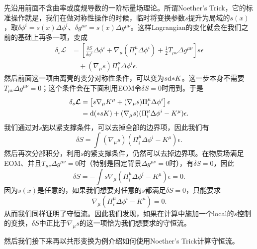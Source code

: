 先沿用前面不含曲率或度规导数的一阶标量场理论。所谓Noether's Trick，它的标准操作就是，我们在做对称性操作的时候，临时将变换参数$s$提升为局域的$s(x)$，取$\delta\phi^i=s(x)\Delta\phi^i$、$\delta g^{\mu\nu}=s(x)\Delta g^{\mu\nu}$。这样Lagrangian的变化就会在我们之前的基础上再多一项，变成
\begin{equation}
    \begin{aligned}
        \delta_s\boldsymbol{\mathcal L}
        &=\left[\frac{\delta S}{\delta\phi^i}\Delta\phi^i
        +\nabla_\mu(\Pi_i^\mu\Delta\phi^i)
        +\frac12T_{\mu\nu}\Delta g^{\mu\nu}\right]s\epsilon\\
        &\quad+(\nabla_\mu s)\Pi_i^\mu\Delta\phi^i\epsilon.
    \end{aligned}
\end{equation}
然后前面这一项由离壳的变分对称性条件，可以变为$s\mathrm d{*K}$。这一步本身不需要$T_{\mu\nu}\Delta g^{\mu\nu}=0$；这个条件会在下面利用EOM令$\delta S=0$时用到。于是
\begin{align}
    \delta_s\boldsymbol{\mathcal L}
    &=\left[s\nabla_\mu K^\mu
    +(\nabla_\mu s)\Pi_i^\mu\Delta\phi^i\right]\epsilon\notag\\
    &=\mathrm d({*sK})+(\nabla_\mu s)(\Pi_i^\mu\Delta\phi^i-K^\mu)\epsilon.
\end{align}
我们通过对$s$施以紧支撑条件，可以去掉全部的边界项，因此我们有
\begin{equation}
    \delta S=\int(\nabla_\mu s)(\Pi_i^\mu\Delta\phi^i-K^\mu)\epsilon.
    \label{eq:noether-trick-standard}
\end{equation}
然后再次分部积分，利用$s$的紧支撑条件，仍然可以去掉边界项。在物质场满足EOM、并且$T_{\mu\nu}\Delta g^{\mu\nu}=0$时（特别是固定背景$\Delta g^{\mu\nu}=0$时），有$\delta S=0$，因此
\begin{equation}
    \delta S=-\int s\nabla_\mu(\Pi_i^\mu\Delta\phi^i-K^\mu)\epsilon=0.
    \label{noether-trick}
\end{equation}
因为$s(x)$是任意的，如果我们想要对任意的$s$都满足$\delta S=0$，只能要求
\begin{equation}
    \nabla_\mu(\Pi_i^\mu\Delta\phi^i-K^\mu)=0.
\end{equation}
从而我们同样证明了守恒流。因此我们发现，如果在计算中施加一个local的$s$控制的变换，$\delta S$中正比于$\nabla_\mu s$的这一项恰为我们想要求的守恒流。

然后我们接下来再以共形变换为例介绍如何使用Noether's Trick计算守恒流。

